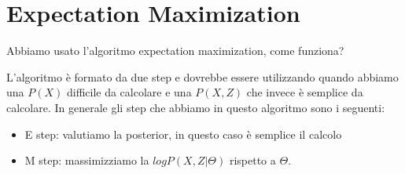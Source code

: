 \documentclass[14pt]{extreport}
\begin{document}
\section{Expectation Maximization}

Abbiamo usato l'algoritmo expectation maximization, come funziona?

L'algoritmo è formato da due step e dovrebbe essere utilizzando quando abbiamo una $P(X)$ difficile da calcolare e una $P(X,Z)$ che invece è semplice
da calcolare. In generale gli step che abbiamo in questo algoritmo sono i seguenti:

\begin{itemize}
	\item E step: valutiamo la posterior, in questo caso è semplice il calcolo
	\item M step: massimizziamo la $log P(X, Z | \Theta)$ rispetto a $\Theta$.
\end{itemize}
\end{document}
